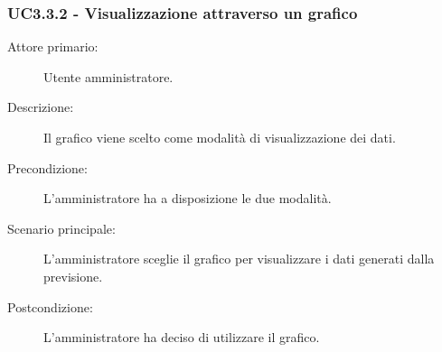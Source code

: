 \subsubsection{UC3.3.2 - Visualizzazione attraverso un grafico}
\label{sssec:uc3.3.2}
\begin{description}
  \item[Attore primario:] Utente amministratore.
  \item[Descrizione:] Il grafico viene scelto come modalità di visualizzazione dei dati.
  \item[Precondizione:] L'amministratore ha a disposizione le due modalità.
  \item[Scenario principale:] L'amministratore sceglie il grafico per visualizzare i dati generati dalla previsione.
  \item[Postcondizione:] L'amministratore ha deciso di utilizzare il grafico.
\end{description}
